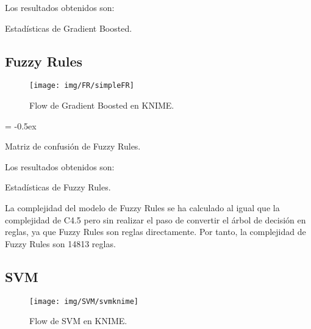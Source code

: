 \documentclass[paper=a4, fontsize=12pt]{article} %
\numberwithin{equation}{section} %
\numberwithin{figure}{section} %
\numberwithin{table}{section} %
\begin{document}
	Los resultados obtenidos son:
	\begin{table}[H]
		\begin{center}
		\end{center}
		\caption {Estadísticas de Gradient Boosted.}
		\label {statisticsGBs}
	\end{table}

\subsection {Fuzzy Rules}

	\begin{figure}[H]
	  \centering
	  \texttt{[image: img/FR/simpleFR]}
	  \caption{Flow de Gradient Boosted en KNIME.}
	  \label{flow_GBs}
	\end{figure}

	\extrarowheight = -0.5ex %
	\renewcommand{\arraystretch}{1.75} %
	\begin{table}[H]
		\begin{center}
		\end{center}
		\caption {Matriz de confusión de Fuzzy Rules.}
		\label {mcFRs}
	\end{table}

	Los resultados obtenidos son:
	\begin{table}[H]
		\begin{center}
		\end{center}
		\caption {Estadísticas de Fuzzy Rules.}
		\label {statisticsFRs}
	\end{table}

	La complejidad del modelo de Fuzzy Rules se ha calculado al igual que la complejidad de C4.5 pero sin realizar el paso de convertir el árbol de decisión en reglas, ya que Fuzzy Rules son reglas directamente. Por tanto, la complejidad de Fuzzy Rules son 14813 reglas.

\subsection {SVM}

	\begin{figure}[H]
	  \centering
	  \texttt{[image: img/SVM/svmknime]}
	  \caption{Flow de SVM en KNIME.}
	  \label{flow_SVMs}
	\end{figure}
\end{document}

